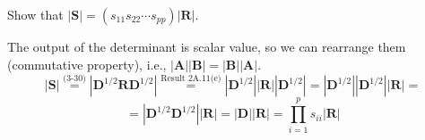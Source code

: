Show that $\left|\textbf{S}\right| = (s_{11}s_{22}\cdots s_{pp})\left|\textbf{R}\right|$.
\newline
\par
The output of the determinant is scalar value, so we can rearrange them (commutative property), i.e., $\left|\textbf{A}\right|\left|\textbf{B}\right| = \left|\textbf{B}\right|\left|\textbf{A}\right|$.
\[
    \left|\textbf{S}\right|
    \overset{\text{(3-30)}}{=}
    \left|{\textbf{D}}^{1/2}\textbf{R}{\textbf{D}}^{1/2}\right|
    \overset{\text{Result 2A.11(e)}}{=}
    \left|{\textbf{D}}^{1/2}\right|
    \Big|\textbf{R}\Big|
    \left|{\textbf{D}}^{1/2}\right|
    =
    \left|{\textbf{D}}^{1/2}\right|
    \left|{\textbf{D}}^{1/2}\right|
    \Big|\textbf{R}\Big|
    =
\]
\[
    =
    \left|
        {\textbf{D}}^{1/2}
        {\textbf{D}}^{1/2}
    \right|
    \Big|\textbf{R}\Big|
    =
    \left|{\textbf{D}}\right|
    \left|\textbf{R}\right|
    =
    \prod_{i=1}^{p}{s_{ii}}
    \left|\textbf{R}\right|
\]